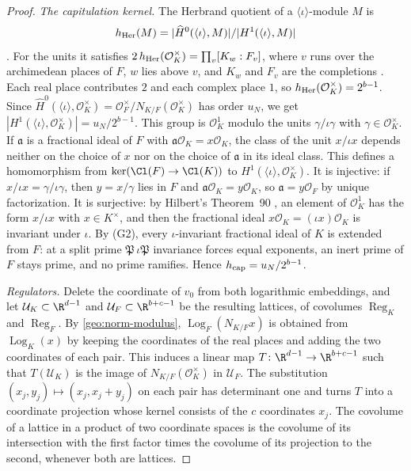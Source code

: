 \begin{proof}
\emph{The capitulation kernel.} The Herbrand quotient of a
$\langle\iota\rangle$-module $M$ is
\[
 h_{\rm Her}(M)=|\widehat H^0(\langle\iota\rangle,M)|/|H^1(\langle\iota\rangle,M)|
\]
\cite[Chapter~II, \S3]{MilneCFT}. For the units it satisfies
$2\,h_{\rm Her}(\mathcal O_K^\times)=\prod_v[K_w:F_v]$, where $v$ runs over the
archimedean places of $F$, $w$ lies above $v$, and $K_w$ and $F_v$ are the
completions \cite[Chapter~VII, Proposition~3.1]{MilneCFT}. Each real place
contributes $2$ and each complex place $1$, so
$h_{\rm Her}(\mathcal O_K^\times)=2^{b-1}$. Since
$\widehat H^0(\langle\iota\rangle,\mathcal O_K^\times)=\mathcal
O_F^\times/N_{K/F}(\mathcal O_K^\times)$ has order $u_N$, we get
$|H^1(\langle\iota\rangle,\mathcal O_K^\times)|=u_N/2^{b-1}$. This group
is $\mathcal O_K^1$ modulo the units $\gamma/\iota\gamma$ with
$\gamma\in\mathcal O_K^\times$. If $\mathfrak a$ is a fractional ideal
of $F$ with $\mathfrak a\mathcal O_K=x\mathcal O_K$, the class of the
unit $x/\iota x$ depends neither on the choice of $x$ nor on the choice
of $\mathfrak a$ in its ideal class. This defines a homomorphism from
$\ker(\Cl(F)\to\Cl(K))$ to $H^1(\langle\iota\rangle,\mathcal O_K^\times)$.
It is injective: if $x/\iota x=\gamma/\iota\gamma$, then $y=x/\gamma$
lies in $F$ and $\mathfrak a\mathcal O_K=y\mathcal O_K$, so
$\mathfrak a=y\mathcal O_F$ by unique factorization. It is surjective:
by Hilbert's Theorem~90 \cite[Chapter~II, Corollary~1.23]{MilneCFT}, an
element of $\mathcal O_K^1$ has the form $x/\iota x$ with
$x\in K^\times$, and then the fractional ideal
$x\mathcal O_K=(\iota x)\mathcal O_K$ is invariant under $\iota$. By
(G2), every $\iota$-invariant fractional ideal of $K$ is extended from
$F$: at a split prime $\mathfrak P\,\iota\mathfrak P$ invariance forces
equal exponents, an inert prime of $F$ stays prime, and no prime
ramifies. Hence $h_{\rm cap}=u_N/2^{b-1}$.

\emph{Regulators.} Delete the coordinate of $v_0$ from both logarithmic
embeddings, and let $\mathcal U_K\subset\R^{d-1}$ and
$\mathcal U_F\subset\R^{b+c-1}$ be the resulting lattices, of covolumes
$\operatorname{Reg}_K$ and $\operatorname{Reg}_F$. By
\eqref{geo:norm-modulus}, $\operatorname{Log}_F(N_{K/F}x)$ is obtained
from $\operatorname{Log}_K(x)$ by keeping the coordinates of the real
places and adding the two coordinates of each pair. This induces a
linear map $T\colon\R^{d-1}\to\R^{b+c-1}$ such that
$T(\mathcal U_K)$ is the image of $N_{K/F}(\mathcal O_K^\times)$ in
$\mathcal U_F$. The substitution $(x_j,y_j)\mapsto(x_j,x_j+y_j)$ on each
pair has determinant one and turns $T$ into a coordinate projection
whose kernel consists of the $c$ coordinates $x_j$. The covolume of a
lattice in a product of two coordinate spaces is the covolume of its
intersection with the first factor times the covolume of its projection
to the second, whenever both are lattices.


\end{proof}
